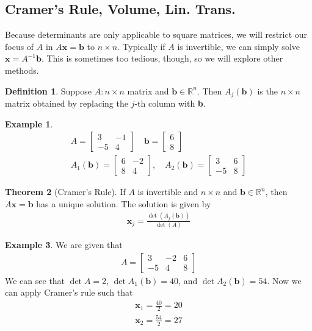 \documentclass{article}
\numberwithin{equation}{section}
\theoremstyle{definition}
\newtheorem{thm}{Theorem}[subsection]
\newtheorem{defn}{Definition}[subsection]
\newtheorem{ex}[thm]{Example}
\newcommand{\R}{\mathbb{R}}
\newcommand{\x}{\times}
\theoremstyle{adefn}
\begin{document}
	\subsection{Cramer's Rule, Volume, Lin. Trans.}
	Because determinants are only applicable to square matrices, we will restrict our focus of $A$ in $A\mathbf{x} = \mathbf{b}$ to $n \x n$. Typically if $A$ is invertible, we can simply solve $\mathbf{x} = A^{-1}\mathbf{b}$. This is sometimes too tedious, though, so we will explore other methods. 
	\begin{defn}
		Suppose $A: n \x n$ matrix and $\mathbf{b} \in \R^n$. Then $A_j(\mathbf{b})$ is the $n \x n$ matrix obtained by replacing the $j$-th column with \textbf{b}. 
	\end{defn}
	\begin{ex}
		\begin{align*}
			A = \begin{bmatrix}
				3 & -1 \\ -5 & 4
			\end{bmatrix}\quad \mathbf{b} = \begin{bmatrix}
			6 \\ 8
			\end{bmatrix} \\ 
			A_1(\mathbf{b}) = \begin{bmatrix}
				6 & -2 \\ 8 & 4
			\end{bmatrix},\quad A_2(\mathbf{b}) = \begin{bmatrix}
				3 & 6 \\ -5 & 8
			\end{bmatrix}
		\end{align*}
	\end{ex}
	\begin{thm}[Cramer's Rule]
		If $A$ is invertible and $n \x n$ and $\mathbf{b} \in \R^n$, then $A\mathbf{x} = \mathbf{b}$ has a unique solution. The solution is given by
		\begin{align*}
			\mathbf{x}_j = \frac{\det(A_j(\mathbf{b}))}{\det(A)}
		\end{align*}
	\end{thm}
	\begin{ex}
		We are given that 
		\begin{align*}
			A = \begin{bmatrix}
				3 & -2 & 6 \\ 
				-5 & 4 & 8
			\end{bmatrix}
		\end{align*}
		We can see that $\det A = 2$, $\det A_1(\mathbf{b}) = 40$, and $\det A_2(\mathbf{b}) = 54$. Now we can apply Cramer's rule such that 
		\begin{align*}
			\mathbf{x}_1 = \frac{40}{2} = 20 \\ 
			\mathbf{x}_2 = \frac{54}{2} = 27
		\end{align*}
	\end{ex}
\end{document}
